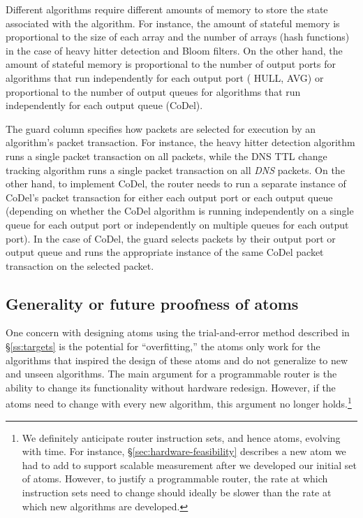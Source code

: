 Different algorithms require different amounts of memory to store the state
associated with the algorithm. For instance, the amount of stateful memory is
proportional to the size of each array and the number of arrays (hash
functions) in the case of heavy hitter detection and Bloom filters. On the
other hand, the amount of stateful memory is proportional to the number of
output ports for algorithms that run independently for each output port (\eg
HULL, AVG) or proportional to the number of output queues for algorithms that
run independently for each output queue (\eg CoDel).

The guard column specifies how packets are selected for execution by an
algorithm's packet transaction. For instance, the heavy hitter detection
algorithm runs a single packet transaction on all packets, while the DNS TTL
change tracking algorithm runs a single packet transaction on all {\em DNS}
packets. On the other hand, to implement CoDel, the router needs to run a
separate instance of CoDel's packet transaction for either each output port or
each output queue (depending on whether the CoDel algorithm is running
independently on a single queue for each output port or independently on
multiple queues for each output port). In the case of CoDel, the guard selects
packets by their output port or output queue and runs the appropriate instance
of the same CoDel packet transaction on the selected packet.

\subsection{Generality or future proofness of atoms}

One concern with designing atoms using the trial-and-error method described in
\S\ref{ss:targets} is the potential for ``overfitting,'' \ie  the atoms only
work for the algorithms that inspired the design of these atoms and do not
generalize to new and unseen algorithms. The main argument for a programmable
router is the ability to change its functionality without hardware redesign.
However, if the atoms need to change with every new algorithm, this argument no
longer holds.\footnote{We definitely anticipate router instruction sets, and
hence atoms, evolving with time. For instance, \S\ref{sec:hardware-feasibility}
describes a new atom we had to add to support scalable measurement after we
developed our initial set of atoms. However, to justify a programmable router,
the rate at which instruction sets need to change should ideally be slower than
the rate at which new algorithms are developed.}

